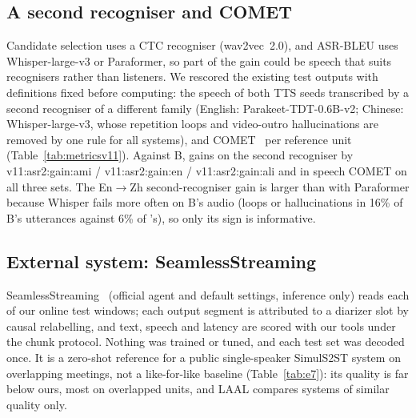 \ifMetricsV
\subsection{A second recogniser and COMET}
\label{app:metricsv11}
Candidate selection uses a CTC recogniser (wav2vec~2.0), and ASR-BLEU uses Whisper-large-v3 or Paraformer, so part of
the gain could be speech that suits recognisers rather than listeners. We rescored the existing test outputs with
definitions fixed before computing: the speech of both TTS seeds transcribed by a second recogniser of a different
family (English: Parakeet-TDT-0.6B-v2; Chinese: Whisper-large-v3, whose repetition loops and video-outro hallucinations
are removed by one rule for all systems), and COMET~\citep{rei2022comet} per reference unit (Table~\ref{tab:metricsv11}).
Against B, \sys{} gains on the second recogniser by \num{v11:asr2:gain:ami} / \num{v11:asr2:gain:en} /
\num{v11:asr2:gain:ali} and in speech COMET on all three sets. The En$\rightarrow$Zh second-recogniser gain is larger
than with Paraformer because Whisper fails more often on B's audio (loops or hallucinations in 16\% of B's utterances
against 6\% of \sys{}'s), so only its sign is informative.

\fi

\subsection{External system: SeamlessStreaming}
\label{app:e7}
SeamlessStreaming~\citep{seamless2023} (official agent and default settings, inference only) reads each of our online
test windows; each output segment is attributed to a diarizer slot by causal relabelling, and text, speech and latency
are scored with our tools under the chunk protocol. Nothing was trained or tuned, and each test set was decoded once.
It is a zero-shot reference for a public single-speaker SimulS2ST system on overlapping meetings, not a like-for-like
baseline (Table~\ref{tab:e7}): its quality is far below ours, most on overlapped units, and LAAL compares systems of
similar quality only.


\ifXT
